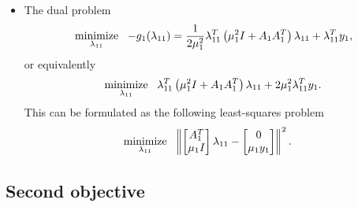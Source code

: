 \documentclass[12pt]{article}
\begin{document}
\begin{itemize}
\item The dual problem
%
\begin{align}
  \mathop{\mbox{minimize}}_{\lambda_{11}} \ \  -g_1(\lambda_{11}) = \frac{1}{2\mu_1^2}\lambda_{11}^T\left(\mu_1^2 I+A_1A_1^T\right)\lambda_{11} + \lambda_{11}^Ty_1,
\end{align}
%
or equivalently
%
\begin{align}
  \mathop{\mbox{minimize}}_{\lambda_{11}} \ \  \lambda_{11}^T\left(\mu_1^2 I+A_1A_1^T\right)\lambda_{11} + 2\mu_1^2\lambda_{11}^Ty_1.
\end{align}
%
This can be formulated as the following least-squares problem
%
\begin{align}
\mathop{\mbox{minimize}}_{\lambda_{11}} \ \  & \left\lVert\begin{bmatrix}A_1^T \\ \mu_1I \end{bmatrix}\lambda_{11} - \begin{bmatrix} 0 \\ \mu_1y_1 \end{bmatrix}\right\rVert^2.
\end{align}

\end{itemize}

\newpage

\subsection{Second objective}
\end{document}
